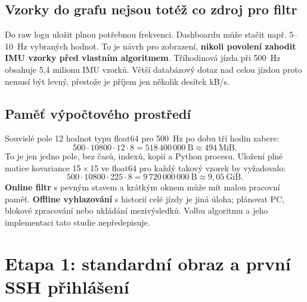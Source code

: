 \documentclass[11pt,a4paper]{article}
\begin{document}
\subsection{Vzorky do grafu nejsou totéž co zdroj pro filtr}
Do raw logu uložit plnou potřebnou frekvenci. Dashboardu může stačit např. 5--10~Hz vybraných hodnot. To je návrh pro zobrazení, \textbf{nikoli povolení zahodit IMU vzorky před vlastním algoritmem}. Tříhodinová jízda při 500~Hz obsahuje 5,4 milionu IMU vzorků. Větší databázový dotaz nad celou jízdou proto nemusí být levný, přestože je příjem jen několik desítek kB/s.

\subsection{Paměť výpočtového prostředí}
Souvislé pole 12 hodnot typu float64 pro 500~Hz po dobu tří hodin zabere:
\begin{equation}
500\cdot10800\cdot12\cdot8=518\,400\,000\ \mathrm{B}\approx494\ \mathrm{MiB}.
\end{equation}
To je jen jedno pole, bez časů, indexů, kopií a Python procesu. Uložení plné matice kovariance 15\,$\times$\,15 ve float64 pro každý takový vzorek by vyžadovalo:
\begin{equation}
500\cdot10800\cdot225\cdot8=9\,720\,000\,000\ \mathrm{B}\approx9{,}05\ \mathrm{GiB}.
\end{equation}
\textbf{Online filtr} s pevným stavem a krátkým oknem může mít malou pracovní paměť. \textbf{Offline vyhlazování} s historií celé jízdy je jiná úloha; plánovat PC, blokové zpracování nebo ukládání mezivýsledků. Volbu algoritmu a jeho implementaci tato studie nepředepisuje.

\clearpage
\section{Etapa 1: standardní obraz a první SSH přihlášení}
\end{document}
